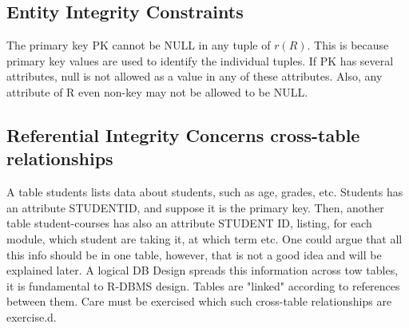 \documentclass[a4paper]{article}
\theoremstyle{plain}
\theoremstyle{definition}
\theoremstyle{remark}
\begin{document}
	\subsection{Entity Integrity Constraints}
	The primary key PK cannot be NULL in any tuple of $r(R)$. This is because primary key values are used to identify the individual tuples. If PK has several attributes, null is not allowed as a value in any of these attributes. Also, any attribute of R even non-key may not be allowed to be NULL. 
	\subsection{Referential Integrity Concerns cross-table relationships}
	A table students lists data about students, such as age, grades, etc.
	Students has an attribute STUDENTID, and suppose it is the primary key. Then, another table student-courses has also an attribute STUDENT ID, listing, for each module, which student are taking it, at which term etc. One could argue that all this info should be in one table, however, that is not a good idea and will be explained later. A logical DB Design spreads this information across tow tables, it is fundamental to R-DBMS design. Tables are "linked" according to references between them. Care must be exercised which such cross-table relationships are exercise.d. 
\end{document}
